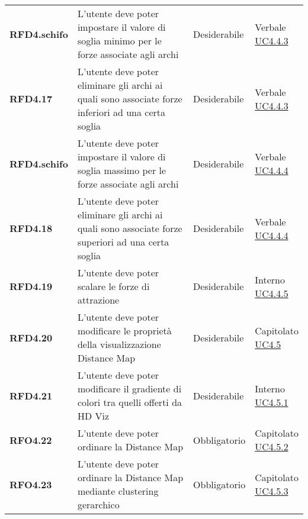 \begin{longtable}[H]{>{\raggedright\bfseries}m{20mm} >{\raggedright}m{90mm} >{\raggedright}m{28mm} >{\raggedright\arraybackslash}m{30mm}}
    RFD4.schifo
    & L'utente deve poter impostare il valore di soglia minimo per le forze associate agli archi
    & Desiderabile
    & \makecell{ Verbale \\ \hyperref[par:uc4.4.2]{UC4.4.3} }\\

    RFD4.17
    & L'utente deve poter eliminare gli archi ai quali sono associate forze inferiori ad una certa soglia
    & Desiderabile
    & \makecell{ Verbale \\ \hyperref[par:uc4.4.3]{UC4.4.3} }\\

    RFD4.schifo
    & L'utente deve poter impostare il valore di soglia massimo per le forze associate agli archi
    & Desiderabile
    & \makecell{ Verbale \\ \hyperref[par:uc4.4.2]{UC4.4.4} }\\

    RFD4.18
    & L'utente deve poter eliminare gli archi ai quali sono associate forze superiori ad una certa soglia
    & Desiderabile
    & \makecell{ Verbale \\ \hyperref[par:uc4.4.4]{UC4.4.4} }\\

    RFD4.19
    & L'utente deve poter scalare le forze di attrazione
    & Desiderabile
    & \makecell{ Interno \\ \hyperref[par:uc4.4.5]{UC4.4.5} }\\

    RFD4.20
    & L'utente deve poter modificare le proprietà della visualizzazione Distance Map
    & Desiderabile
    & \makecell{ Capitolato \\ \hyperref[ssub:uc4.5]{UC4.5} }\\

    RFD4.21
    & L'utente deve poter modificare il gradiente di colori tra quelli offerti da HD Viz
    & Desiderabile
    & \makecell{ Interno \\ \hyperref[par:uc4.5.1]{UC4.5.1} }\\

    RFO4.22
    & L'utente deve poter ordinare la Distance Map
    & Obbligatorio
    & \makecell{ Capitolato \\ \hyperref[par:uc4.5.2]{UC4.5.2} }\\

    RFO4.23
    & L'utente deve poter ordinare la Distance Map mediante clustering gerarchico
    & Obbligatorio
    & \makecell{ Capitolato \\ \hyperref[par:uc4.5.3]{UC4.5.3} }\\


\end{longtable}
